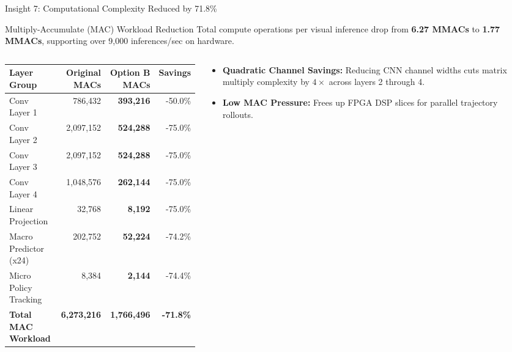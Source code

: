 \documentclass[aspectratio=169, 10pt]{beamer}
\begin{document}
\begin{frame}{Insight 7: Computational Complexity Reduced by 71.8\%}
  \begin{block}{Multiply-Accumulate (MAC) Workload Reduction}
    Total compute operations per visual inference drop from \textbf{6.27 MMACs} to \textbf{1.77 MMACs}, supporting over 9,000 inferences/sec on hardware.
  \end{block}
  \vspace{-0.2cm}
  \begin{columns}[T]
    \begin{column}{0.52\textwidth}
      \setlength{\tabcolsep}{2pt}
      \begin{table}
        \centering
        \scriptsize
        \begin{tabular}{lrrr}
          \toprule
          \textbf{Layer Group} & \textbf{Original MACs} & \textbf{Option B MACs} & \textbf{Savings} \\
          \midrule
          Conv Layer 1 & 786,432 & \textbf{393,216} & -50.0\% \\
          Conv Layer 2 & 2,097,152 & \textbf{524,288} & -75.0\% \\
          Conv Layer 3 & 2,097,152 & \textbf{524,288} & -75.0\% \\
          Conv Layer 4 & 1,048,576 & \textbf{262,144} & -75.0\% \\
          Linear Projection & 32,768 & \textbf{8,192} & -75.0\% \\
          Macro Predictor (x24) & 202,752 & \textbf{52,224} & -74.2\% \\
          Micro Policy Tracking & 8,384 & \textbf{2,144} & -74.4\% \\
          \midrule
          \textbf{Total MAC Workload} & \textbf{6,273,216} & \textbf{1,766,496} & \textbf{-71.8\%} \\
          \bottomrule
        \end{tabular}
      \end{table}
    \end{column}
    \begin{column}{0.44\textwidth}
      \begin{itemize}
        \item \textbf{Quadratic Channel Savings:} Reducing CNN channel widths cuts matrix multiply complexity by $4\times$ across layers 2 through 4.
        \item \textbf{Low MAC Pressure:} Frees up FPGA DSP slices for parallel trajectory rollouts.
      \end{itemize}
    \end{column}
  \end{columns}
\end{frame}
\end{document}
